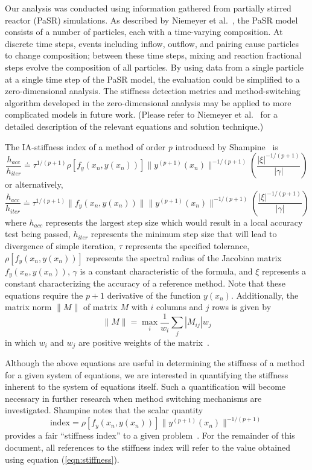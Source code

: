 \documentclass[12pt]{ussci}
\begin{document}
Our analysis was conducted using information gathered from partially stirred reactor (PaSR) simulations. As described by Niemeyer et al.~\cite{Niemeyer:2017}, the PaSR model consists of a number of particles, each with a time-varying composition. At discrete time steps, events including inflow, outflow, and pairing cause particles to change composition; between these time steps, mixing and reaction fractional steps evolve the composition of all particles. By using data from a single particle at a single time step of the PaSR model, the evaluation could be simplified to a zero-dimensional analysis. The stiffness detection metrics and method-switching algorithm developed in the zero-dimensional analysis may be applied to more complicated models in future work.
(Please refer to Niemeyer et al.~\cite{Niemeyer:2017} for a detailed description of the relevant equations and solution technique.)

The IA-stiffness index of a method of order \textit{p} introduced by Shampine~\cite{Shampine1982} is
\begin{equation}
    \frac{h_{acc}}{h_{iter}} \doteq \tau ^ {1/(p + 1)} \rho [f_y(x_n,y(x_n))] \|y^{(p+1)}(x_n)\|^{-1/(p+1)} \left( \frac{|\xi|^{-1/(p+1)}}{|\gamma|} \right)
\end{equation}
or alternatively,
\begin{equation}
    \frac{h_{acc}}{h_{iter}} \doteq \tau ^ {1/(p + 1)} \|f_y(x_n,y(x_n))\|\|y^{(p+1)}(x_n)\|^{-1/(p+1)} \left( \frac{|\xi|^{-1/(p+1)}}{|\gamma|} \right)
\end{equation}
where $h_{acc}$ represents the largest step size which would result in a local accuracy test being passed, $h_{iter}$ represents the minimum step size that will lead to divergence of simple iteration, $\tau$ represents the specified tolerance, $\rho [f_y(x_n,y(x_n))]$ represents the spectral radius of the Jacobian matrix $f_y(x_n,y(x_n))$, $\gamma$ is a constant characteristic of the formula, and $\xi$ represents a constant characterizing the accuracy of a reference method. Note that these equations require the $p+1$ derivative of the function $y(x_n)$. Additionally, the matrix norm $\|M\|$ of matrix $M$ with $i$ columns and $j$ rows is given by
\begin{equation}
    \|M\| = \max_{i} \frac{1}{w_i} \sum_{j} |M_{ij}|w_j
\end{equation}
in which \(w_i\) and \(w_j\) are positive weights of the matrix~\cite{Shampine1985}.

Although the above equations are useful in determining the stiffness of a method for a given system of equations, we are interested in quantifying the stiffness inherent to the system of equations itself. Such a quantification will become necessary in further research when method switching mechanisms are investigated. Shampine notes that the scalar quantity 
\begin{equation}\label{eqn:stiffness}
    \textrm{index} = \rho [f_y(x_n,y(x_n))] \|y^{(p+1)}(x_n)\|^{-1/(p+1)}
\end{equation}
provides a fair ``stiffness index'' to a given problem~\cite{Shampine1985}. For the remainder of this document, all references to the stiffness index will refer to the value obtained using equation (\ref{eqn:stiffness}).
\end{document}
